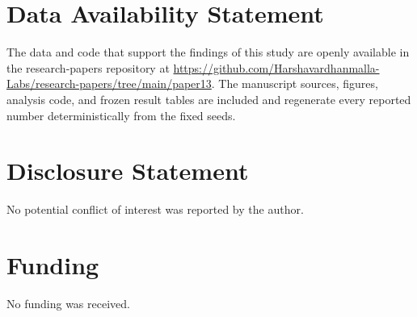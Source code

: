 \documentclass[journal]{IEEEtran}
\begin{document}
\section*{Data Availability Statement}
The data and code that support the findings of this study are openly available in the research-papers repository at \url{https://github.com/Harshavardhanmalla-Labs/research-papers/tree/main/paper13}. The manuscript sources, figures, analysis code, and frozen result tables are included and regenerate every reported number deterministically from the fixed seeds.

\section*{Disclosure Statement}
No potential conflict of interest was reported by the author.

\section*{Funding}
No funding was received.
\end{document}
